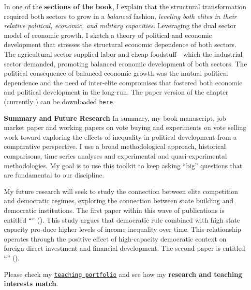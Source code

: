 \documentclass[10pt,stdletter,dateno,sigleft]{newlfm} %
\begin{document}
\begin{newlfm}
In one of the {\bf sections of the book}, I explain that the structural transformation required both sectors to grow in a \emph{balanced} fashion, \emph{leveling both elites in their relative political, economic, and military capacities}. Leveraging the dual sector model of economic growth, I sketch a theory of political and economic development that stresses the structural economic dependence of both sectors. The agricultural sector supplied labor and cheap foodstuff---which the industrial sector demanded, promoting balanced economic development of both sectors. The political consequence of balanced economic growth was the mutual political dependence and the need of inter-elite compromises that fostered both economic and political development in the long-run. The paper version of the chapter (currently \emph{\unskip}) can be downloaded \href{https://github.com/hbahamonde/Negative_Link_Paper/raw/master/Bahamonde_NegativeLink.pdf}{\texttt{here}}. 


{\bf Summary and Future Research} In summary, my book manuscript, job market paper and working papers on vote buying and experiments on vote selling work toward exploring the effects of inequality in political development from a comparative perspective. I use a broad methodological approach, historical comparisons, time series analyses and experimental and quasi-experimental methodologies. My goal is to use this toolkit to keep asking ``big'' questions that are fundamental to our discipline. 

My future research will seek to study the connection between elite competition and democratic regimes, exploring the connection between state building and democratic institutions. The first paper within this wave of publications is entitled ``\href{https://github.com/hbahamonde/Inequality_State_Capacity/raw/main/Bahamonde_Trasberg.pdf}{\unskip}'' ({\unskip}). This study argues that democratic rule combined with high state capacity pro-duce higher levels of income inequality over time. This relationship operates through the positive effect of high-capacity democratic context on foreign direct investment and financial development. The second paper is entitled ``\href{https://raw.githubusercontent.com/hbahamonde/Tobalaba/main/abstract.txt}{\unskip}'' ({\unskip}). {\unskip} 

Please check my \href{http://www.hectorbahamonde.com/teaching/}{\texttt{teaching portfolio}} and see how my {\bf research and teaching interests match}. {\unskip}


\vspace{-10cm}



\end{newlfm}
\end{document}
